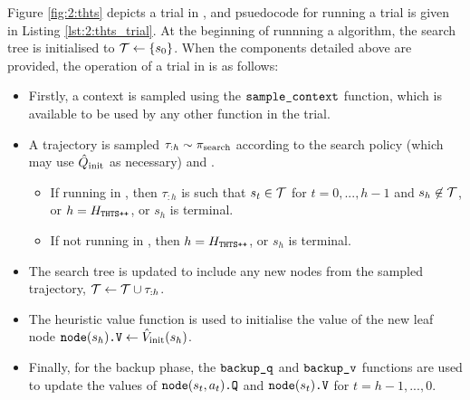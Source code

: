         Figure \ref{fig:2:thts} depicts a trial in \thtspp, and psuedocode for running a trial is given in Listing \ref{lst:2:thts_trial}. At the beginning of runnning a \thtspp\ewe algorithm, the search tree is initialised to $\mathcal{T}\leftarrow\{s_0\}$. When the components detailed above are provided, the operation of a trial in \thtspp\ewe is as follows:
        \begin{itemize}
            \item Firstly, a context is sampled using the ${\textnormal{\texttt{sample\_context}}}$ function, which is available to be used by any other function in the trial.
            \item A trajectory is sampled $\tau_{:h}\sim{\pi_{\textnormal{search}}}$ according to the search policy (which may use ${\hat{Q}_{\textnormal{init}}}$ as necessary) and \sampleoutcome.
            \begin{itemize}
                \item If running in \mctsmode, then $\tau_{:h}$ is such that $s_t\in\mathcal{T}$ for $t=0,...,h-1$ and $s_h\not\in\mathcal{T}$, or $h=H_{{\textnormal{\texttt{THTS++}}}}$, or $s_h$ is terminal.
                \item If not running in \mctsmode, then $h=H_{{\textnormal{\texttt{THTS++}}}}$, or $s_h$ is terminal.
            \end{itemize}
            \item The search tree is updated to include any new nodes from the sampled trajectory, $\mathcal{T}\leftarrow\mathcal{T}\cup\tau_{:h}$.
            \item The heuristic value function is used to initialise the value of the new leaf node ${{\textnormal{\texttt{node}}}(s_h)\textnormal{\texttt{.V}}}\leftarrow {\hat{V}_{\textnormal{init}}}(s_h)$.
            \item Finally, for the backup phase, the ${\textnormal{\texttt{backup\_q}}}$ and ${\textnormal{\texttt{backup\_v}}}$ functions are used to update the values of ${{\textnormal{\texttt{node}}}(s_t,a_t)\textnormal{\texttt{.Q}}}$ and ${{\textnormal{\texttt{node}}}(s_t)\textnormal{\texttt{.V}}}$ for $t=h-1,...,0$.
        \end{itemize}
               

